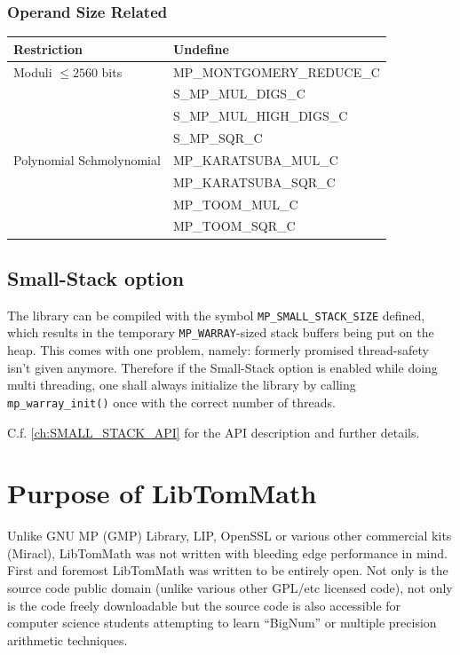 \documentclass[synpaper]{book}
\begin{document}
\subsubsection{Operand Size Related}
\begin{small}
  \begin{center}
    \begin{tabular}{|l|l|}
      \hline \textbf{Restriction}     & \textbf{Undefine}         \\
      \hline Moduli $\le 2560$ bits   & MP\_MONTGOMERY\_REDUCE\_C \\
                                      & S\_MP\_MUL\_DIGS\_C       \\
                                      & S\_MP\_MUL\_HIGH\_DIGS\_C \\
                                      & S\_MP\_SQR\_C             \\
      \hline Polynomial Schmolynomial & MP\_KARATSUBA\_MUL\_C     \\
                                      & MP\_KARATSUBA\_SQR\_C     \\
                                      & MP\_TOOM\_MUL\_C          \\
                                      & MP\_TOOM\_SQR\_C          \\

      \hline
    \end{tabular}
  \end{center}
\end{small}

\subsection{Small-Stack option}
\label{ch:SMALL_STACK_INTRO}
The library can be compiled with the symbol \texttt{MP\_SMALL\_STACK\_SIZE} defined, which results in
the temporary \texttt{MP\_WARRAY}-sized stack buffers being put on the heap.
This comes with one problem, namely: formerly promised thread-safety isn't given anymore.
Therefore if the Small-Stack option is enabled while doing multi threading, one shall always initialize
the library by calling \texttt{mp\_warray\_init()} once with the correct number of threads.

C.f. \ref{ch:SMALL_STACK_API} for the API description and further details.

\section{Purpose of LibTomMath}
Unlike	GNU MP (GMP) Library, LIP, OpenSSL or various other commercial kits (Miracl), LibTomMath
was not written with bleeding edge performance in mind.  First and foremost LibTomMath was written
to be entirely open. Not only is the source code public domain (unlike various other GPL/etc
licensed code), not only is the code freely downloadable but the source code is also accessible for
computer science students attempting to learn ``BigNum'' or multiple precision arithmetic
techniques.
\end{document}
